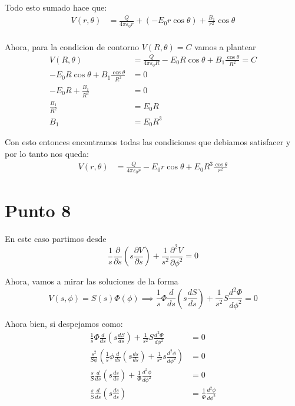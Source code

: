 \documentclass{report}
\begin{document}
Todo esto sumado hace que:
\begin{align*}
	V \left( r, \theta \right) &= \frac{Q}{4\pi \varepsilon_0 r} + \left( - E_0 r \cos\theta \right) + \frac{B_1}{r^2}\cos\theta\\
\end{align*}

Ahora, para la condicion de contorno $V(R, \theta) = C$ vamos a plantear
\begin{align*}
	V \left( R, \theta \right) &= \frac{Q}{4\pi\varepsilon_0 R} - E_0 R \cos\theta + B_1 \frac{\cos\theta}{R^2} = C\\
	-E_0R\cos\theta + B_1 \frac{\cos\theta}{R^2} &= 0\\
	-E_0R + \frac{B_1}{R^2} &= 0\\
	\frac{B_1}{R^2} &= E_0R\\
	B_1 &= E_0R^3
\end{align*}

Con esto entonces encontramos todas las condiciones que debiamos satisfacer y por lo tanto nos queda:
\begin{align*}
	V \left( r, \theta \right) &= \frac{Q}{4\pi \varepsilon_0 r } - E_0 r \cos\theta + E_0 R^3 \frac{\cos\theta}{r^2}
\end{align*}

\chapter{Punto 8}

En este caso partimos desde \[
	\frac{1}{s}\frac{\partial}{\partial s} \left( s \frac{\partial V}{\partial s} \right) + \frac{1}{s^2}\frac{\partial^2 V}{\partial \phi^2} = 0
\]

Ahora, vamos a mirar las soluciones de la forma \[
	V \left( s, \phi \right) = S(s)\Phi(\phi) \implies \frac{1}{s}\Phi \frac{d}{ds} \left( s \frac{dS}{ds} \right) + \frac{1}{s^2} S\frac{d^2\Phi}{d\phi^2} = 0
\]

Ahora bien, si despejamos como:
\begin{align*}
	\frac{1}{s}\Phi \frac{d}{ds} \left( s \frac{dS}{ds} \right) + \frac{1}{s^2} S\frac{d^2\Phi}{d\phi^2} &= 0\\
	\frac{s^2}{S\phi} \left( \frac{1}{s}\phi \frac{d}{ds} \left( s \frac{ds}{ds} \right) + \frac{1}{s^2} s\frac{d^2\phi}{d\phi^2} \right) &= 0\\
	\frac{s}{S}\frac{d}{ds} \left( s \frac{ds}{ds} \right) + \frac{1}{\Phi}\frac{d^2\phi}{d\phi^2} &= 0\\
	\frac{s}{S}\frac{d}{ds} \left( s \frac{ds}{ds} \right) &= \frac{1}{\Phi}\frac{d^2\phi}{d\phi^2}
\end{align*}
\end{document}
